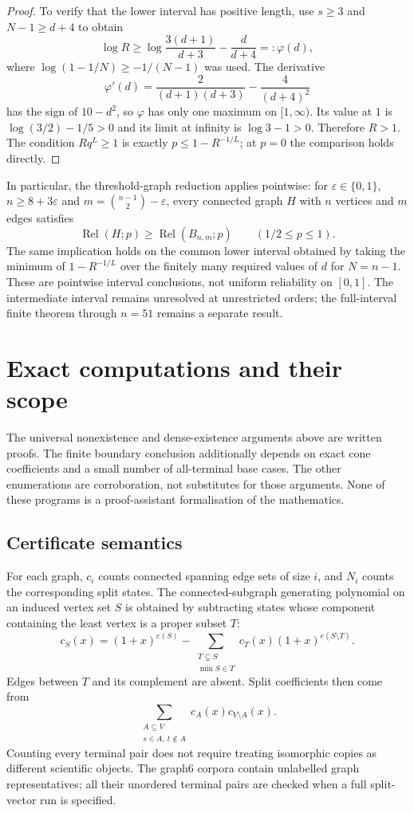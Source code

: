 \documentclass[
  11pt,
]{article}
\newcounter{none} %
\theoremstyle{definition}
\theoremstyle{remark}
\begin{document}
\begin{proof}
To verify that the lower interval has positive length, use $s\ge3$ and $N-1\ge d+4$ to obtain
$$
\log R\ge\log\frac{3(d+1)}{d+3}-\frac d{d+4}=:\varphi(d),
$$
where $\log(1-1/N)\ge-1/(N-1)$ was used. The derivative
$$\varphi'(d)=\frac2{(d+1)(d+3)}-\frac4{(d+4)^2}$$
has the sign of $10-d^2$, so $\varphi$ has only one maximum on $[1,\infty)$. Its value at $1$ is $\log(3/2)-1/5>0$ and its limit at infinity is $\log3-1>0$. Therefore $R>1$. The condition $Rq^L\ge1$ is exactly $p\le1-R^{-1/L}$; at $p=0$ the comparison holds directly.
\end{proof}

In particular, the threshold-graph reduction applies pointwise: for
\(\varepsilon\in\{0,1\}\), \(n\ge8+3\varepsilon\) and
\(m=\binom{n-1}{2}-\varepsilon\), every connected graph \(H\) with \(n\)
vertices and \(m\) edges satisfies
\[\operatorname{Rel}(H;p)\ge\operatorname{Rel}(B_{n,m};p)\qquad(1/2\le p\le1).\]
The same implication holds on the common lower interval obtained by
taking the minimum of \(1-R^{-1/L}\) over the finitely many required
values of \(d\) for \(N=n-1\). These are pointwise interval conclusions,
not uniform reliability on \([0,1]\). The intermediate interval remains
unresolved at unrestricted orders; the full-interval finite theorem
through \(n=51\) remains a separate result.

\section{Exact computations and their
scope}\label{exact-computations-and-their-scope}

The universal nonexistence and dense-existence arguments above are
written proofs. The finite boundary conclusion additionally depends on
exact cone coefficients and a small number of all-terminal base cases.
The other enumerations are corroboration, not substitutes for those
arguments. None of these programs is a proof-assistant formalisation of
the mathematics.

\subsection{Certificate semantics}\label{certificate-semantics}

For each graph, \(c_i\) counts connected spanning edge sets of size
\(i\), and \(N_i\) counts the corresponding split states. The
connected-subgraph generating polynomial on an induced vertex set \(S\)
is obtained by subtracting states whose component containing the least
vertex is a proper subset \(T\): \[c_S(x)=(1+x)^{e(S)}-
\sum_{\substack{T\subsetneq S\\\min S\in T}}
c_T(x)(1+x)^{e(S\setminus T)}.\] Edges between \(T\) and its complement
are absent. Split coefficients then come from
\[\sum_{\substack{A\subseteq V\\s\in A,\ t\notin A}}
c_A(x)c_{V\setminus A}(x).\] Counting every terminal pair does not
require treating isomorphic copies as different scientific objects. The
graph6 corpora contain unlabelled graph representatives; all their
unordered terminal pairs are checked when a full split-vector run is
specified.
\end{document}
